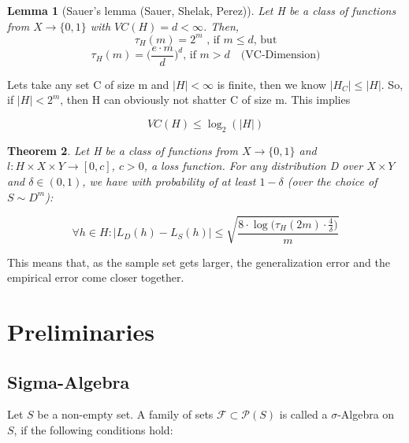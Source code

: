 \documentclass{scrarticle}
\newtheorem{theorem}{Theorem}[section]
\newtheorem{lemma}[theorem]{Lemma}
\begin{document}
\begin{lemma}[Sauer's lemma (Sauer, Shelak, Perez)]
    Let H be a class of functions from $X \to \{0,1\}$ with $VC(H) = d < \infty$. Then, 
    \begin{equation}
    \tau_H(m) = 2^m \text{ , if } m\leq d \text{, but} 
    \end{equation}
    \begin{equation}
    \tau_H(m) = \big (\frac{e \cdot m}{d}\big )^d\text{, if } m>d \quad\text{(VC-Dimension)} 
    \end{equation}
\end{lemma}

Lets take any set C of size m and $|H|<\infty$ is finite, then we know $|H_C| \leq |H|$. So, if $|H| <2^m $, then H can obviously not shatter C of size m. This implies 

\begin{equation}
    VC(H) \leq \log_2(|H|)
\end{equation}

\begin{theorem}
    Let H be a class of functions from $X \to \{0,1\}$ and $l: H \times X \times Y \to [0,c]$, $c>0$, a loss function. For any distribution D over $X \times Y$ and $\delta \in (0,1)$, we have with probability of at least $1-\delta$ (over the choice of $S \sim D^m$): 

    \begin{equation}
        \forall h \in H: |L_D(h)-L_S(h)| \leq \sqrt{\frac{8 \cdot \log \big (\tau_H(2m) \cdot  \frac{4}{\delta} \big )}{m}}
    \end{equation}
\end{theorem}

This means that, as the sample set gets larger, the generalization error and the empirical error come closer together. 














\appendix

\section{Preliminaries}

\subsection{Sigma-Algebra}
Let $S$ be a non-empty set. A family of sets $\mathcal{F} \subset \mathcal{P}(S)$ is called a $\sigma$-Algebra on $S$, if the following conditions hold: 
\end{document}

